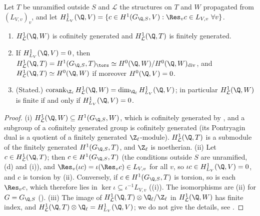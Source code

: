 \begin{proposition}\label{prop:galcoh:selmer-l-adic}
Let $T$ be unramified outside $S$ and $\mathcal L$ the structures on $T$ and $W$ propagated from $(L_{V,v})_v$, and let
$H^1_{L_V}(\Q,V)=\{c\in H^1(G_{\Q,S},V):\Res_vc\in L_{V,v}\ \forall v\}$.
\begin{enumerate}[label=(\roman*)]
\item $H^1_{\mathcal L}(\Q,W)$ is cofinitely generated and $H^1_{\mathcal L}(\Q,T)$ is finitely generated.
\item If $H^1_{L_V}(\Q,V)=0$, then $H^1_{\mathcal L}(\Q,T)=H^1(G_{\Q,S},T)_{\tors}\simeq H^0(\Q,W)/H^0(\Q,W)_{\mathrm{div}}$, and $H^1_{\mathcal L}(\Q,T)\simeq H^0(\Q,W)$ if moreover
$H^0(\Q,V)=0$.
\item (Stated.) $\operatorname{corank}_{\Z_\ell}H^1_{\mathcal L}(\Q,W)=\dim_{\Q_\ell}H^1_{L_V}(\Q,V)$; in particular $H^1_{\mathcal L}(\Q,W)$ is finite if and only if $H^1_{L_V}(\Q,V)=0$.
\end{enumerate}
\end{proposition}

\begin{proof}
(i) $H^1_{\mathcal L}(\Q,W)\subseteq H^1(G_{\Q,S},W)$, which is cofinitely generated by , and a subgroup of a cofinitely generated group is
cofinitely generated (its Pontryagin dual is a quotient of a finitely generated $\Z_\ell$-module). $H^1_{\mathcal L}(\Q,T)$ is a submodule of the finitely generated
$H^1(G_{\Q,S},T)$, and $\Z_\ell$ is noetherian.
(ii) Let $c\in H^1_{\mathcal L}(\Q,T)$; then $c\in H^1(G_{\Q,S},T)$ (the conditions outside $S$ are unramified, (d) and
(i)), and $\Res_v(\iota c)=\iota(\Res_vc)\in L_{V,v}$ for all $v$, so $\iota c\in H^1_{L_V}(\Q,V)=0$, and $c$ is torsion by
(ii). Conversely, if $c\in H^1(G_{\Q,S},T)$ is torsion, so is each $\Res_vc$, which therefore lies in $\ker\iota\subseteq\iota^{-1}L_{V,v}$
((i)). The isomorphisms are (ii) for $G=G_{\Q,S}$ ().
(iii) The image of $H^1_{\mathcal L}(\Q,T)\otimes\Q_\ell/\Z_\ell$ in $H^1_{\mathcal L}(\Q,W)$ has finite index, and $H^1_{\mathcal L}(\Q,T)\otimes\Q_\ell=H^1_{L_V}(\Q,V)$; we do not give the details,
see \cite[Section 1.5]{Rubin}.
\end{proof}

